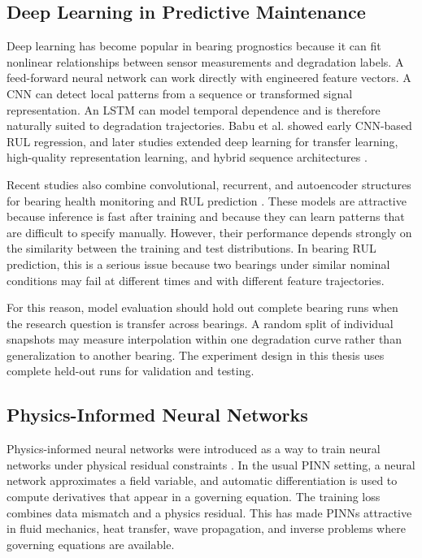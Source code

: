\subsection{Deep Learning in Predictive Maintenance}

Deep learning has become popular in bearing prognostics because it can fit nonlinear relationships between sensor measurements and degradation labels. A feed-forward neural network can work directly with engineered feature vectors. A CNN can detect local patterns from a sequence or transformed signal representation. An LSTM can model temporal dependence and is therefore naturally suited to degradation trajectories. Babu et al. \cite{babu2016} showed early CNN-based RUL regression, and later studies extended deep learning for transfer learning, high-quality representation learning, and hybrid sequence architectures \cite{berghout2022,ayman2025,wang2025}.

Recent studies also combine convolutional, recurrent, and autoencoder structures for bearing health monitoring and RUL prediction \cite{farooq2024,han2024,yang2024}. These models are attractive because inference is fast after training and because they can learn patterns that are difficult to specify manually. However, their performance depends strongly on the similarity between the training and test distributions. In bearing RUL prediction, this is a serious issue because two bearings under similar nominal conditions may fail at different times and with different feature trajectories.

For this reason, model evaluation should hold out complete bearing runs when the research question is transfer across bearings. A random split of individual snapshots may measure interpolation within one degradation curve rather than generalization to another bearing. The experiment design in this thesis uses complete held-out runs for validation and testing.

\subsection{Physics-Informed Neural Networks}

Physics-informed neural networks were introduced as a way to train neural networks under physical residual constraints \cite{raissi2019}. In the usual PINN setting, a neural network approximates a field variable, and automatic differentiation is used to compute derivatives that appear in a governing equation. The training loss combines data mismatch and a physics residual. This has made PINNs attractive in fluid mechanics, heat transfer, wave propagation, and inverse problems where governing equations are available.


